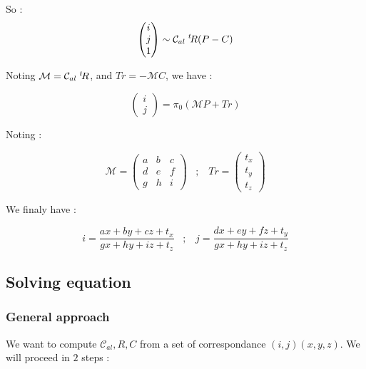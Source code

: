 So :
\begin{equation}
	   \begin{pmatrix} i \\ j \\ 1\end{pmatrix}
		   \sim \mathcal{C}_{al}  \; ^{t} \! R  (P-C)
\end{equation}

Noting $  \mathcal{M} =  \mathcal{C}_{al}  \; ^{t} \! R $, and $Tr = -\mathcal{M} C$, we have :

\begin{equation}
	\begin{pmatrix} i \\ j \end{pmatrix} = \pi_0 ( \mathcal{M} P + Tr )
\end{equation}

Noting :

\begin{equation}
	\mathcal{M}   =  \begin{pmatrix} a & b & c \\ d & e & f \\ g & h & i \end{pmatrix} 
   \;\;\; ; \;\;\;
	 Tr  =  \begin{pmatrix} t_x \\ t_y \\ t_z \end{pmatrix} 
\end{equation}

We finaly have :

\begin{equation}
	i = \frac{ax+by+cz+t_x}{gx+hy+iz+t_z}
   \;\;\; ; \;\;\;
	j = \frac{dx+ey+fz+t_y}{gx+hy+iz+t_z}
	\label{EqHomSRU}
\end{equation}


\subsection{Solving equation}

\subsubsection{General approach}

We want to compute $\mathcal{C}_{al},R,C$  from a set of correspondance $(i,j) (x,y,z)$.
We will proceed in $2$ steps :

